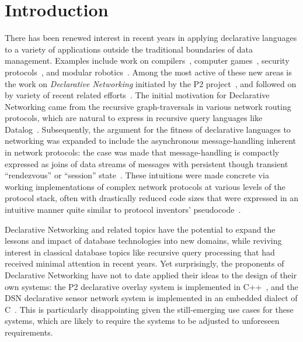 \documentclass{sigmod08}
\begin{document}
\section{Introduction}
There has been renewed interest in recent years in applying declarative
languages to a variety of applications outside the traditional
boundaries of data management.  Examples include work on
compilers~\cite{lam05context}, computer games~\cite{white-sigmod07}, security
protocols~\cite{li-padl03}, and modular
robotics~\cite{ashley-iros07}. Among the most active of these new areas
is the work on {\em Declarative Networking} initiated by the P2
project~\cite{loo-sigmod06,singh-eurosys06}, and followed on by variety
of recent related
efforts~\cite{chu-sensys07,abadi-netdb07,belaramani-sosp07,soule-sosp07}.
The initial motivation for Declarative Networking came from the
recursive graph-traversals in various network routing protocols, which
are natural to express in recursive query languages like
Datalog~\cite{loo-sigcomm05}.  Subsequently, the argument for the
fitness of declarative languages to networking was expanded to include
the asynchronous message-handling inherent in network protocols: the
case was made that message-handling is compactly expressed as joins of
data streams of messages with persistent though transient ``rendezvous''
or ``session'' state~\cite{loo-sosp05,loo-sigmod06}.  These intuitions
were made concrete via working implementations of complex network
protocols at various levels of the protocol stack, often with
drastically reduced code sizes that were expressed in an intuitive
manner quite similar to protocol inventors'
pseudocode~\cite{loo-sosp05,chu-sensys07}.  


Declarative Networking and related topics have the potential to expand the lessons and impact of database technologies into new domains, while reviving interest in classical database topics like recursive query processing that had received minimal attention in recent years.  Yet surprisingly, the proponents of Declarative Networking have not to date applied their ideas to the design of their own systems: the P2 declarative overlay system is implemented in C++~\cite{loo-sosp05}, and the DSN declarative sensor network system is implemented in an embedded dialect of C~\cite{chu-sensys07}.  This is particularly disappointing given the still-emerging use cases for these systems, which are likely to require the systems to be adjusted to unforeseen requirements.
\end{document}
